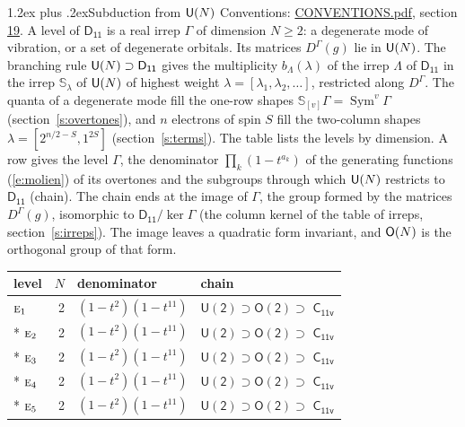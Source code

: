 \documentclass[10pt,a4paper]{article}
\makeatletter
\renewcommand\section{\@startsection{section}{1}{\z@}{-3ex plus -1ex minus -.2ex}%
  {1.2ex plus .2ex}{\normalfont\large\sffamily\bfseries\color{parttitle}}}
\numberwithin{equation}{section}
\newcommand{\grp}[1]{\mathsf{#1}}
\newcommand{\irr}[1]{\text{\normalfont\scshape #1}}
\newcommand{\repD}[1]{D^{#1}}
\newcommand{\schur}[1]{\mathbb{S}_{#1}}
\newcommand{\shape}[1]{[#1]}
\makeatother
\begin{document}
\section{Subduction from \texorpdfstring{$\grp{U(\mathnormal{N})}$}{U(N)}}\label{s:unitary}
Conventions: \href{../../CONVENTIONS.pdf}{CONVENTIONS.pdf}, section \href{../../CONVENTIONS.pdf\#conv.19}{19}.
\leavevmode\label{n:local.level.dimension}A level of $\grp{D_{11}}$ is a real irrep $\Gamma$ of dimension $N \ge 2$: a degenerate mode of vibration, or a set of degenerate orbitals. \label{n:group.unitary}Its matrices $\repD{\Gamma}(g)$ lie in $\grp{U(\mathnormal{N})}$. \label{n:irrep.schur}\label{n:shape.partition}\label{n:local.partition}\label{n:function.multiplicity.unitary}The branching rule $\grp{U(\mathnormal{N})} \supset \grp{D_{11}}$ gives the multiplicity $b_\Lambda(\lambda)$ of the irrep $\Lambda$ of $\grp{D_{11}}$ in the irrep $\schur{\lambda}$ of $\grp{U(\mathnormal{N})}$ of highest weight $\lambda = \shape{\lambda_1, \lambda_2, \dots}$, restricted along $\repD{\Gamma}$. \label{n:local.partition.power}\label{n:local.electrons}\label{n:local.spin}The quanta of a degenerate mode fill the one-row shapes $\schur{\shape{v}}\Gamma = \operatorname{Sym}^{v}\Gamma$ (section~\ref{s:overtones}), and $n$ electrons of spin $S$ fill the two-column shapes $\lambda = \shape{2^{n/2-S}, 1^{2S}}$ (section~\ref{s:terms}).
The table lists the levels by dimension. \label{n:head.level}\label{n:head.denominator}\label{n:index.overtone.denominator}\label{n:head.chain}A row gives the level $\Gamma$, the denominator $\prod_k (1 - t^{a_k})$ of the generating functions (\ref{e:molien}) of its overtones and the subgroups through which $\grp{U(\mathnormal{N})}$ restricts to $\grp{D_{11}}$ (chain). The chain ends at the image of $\Gamma$, the group formed by the matrices $\repD{\Gamma}(g)$, isomorphic to $\grp{D_{11}}/\ker\Gamma$ (the column kernel of the table of irreps, section~\ref{s:irreps}). The image leaves a quadratic form invariant, and $\grp{O(\mathnormal{N})}$ is the orthogonal group of that form.
{\small\begin{longtable}{@{}lrll@{}}\toprule
level & $N$ & denominator & chain\\\midrule\endhead
\bottomrule\endfoot\endlastfoot
$\irr{e}_{1}$ & 2 & $(1-t^{2})(1-t^{11})$ & $\grp{U(2)} \supset \grp{O(2)} \supset$ \href{C11v.pdf}{$\grp{C_{11v}}$}\\*
$\irr{e}_{2}$ & 2 & $(1-t^{2})(1-t^{11})$ & $\grp{U(2)} \supset \grp{O(2)} \supset$ \href{C11v.pdf}{$\grp{C_{11v}}$}\\*
$\irr{e}_{3}$ & 2 & $(1-t^{2})(1-t^{11})$ & $\grp{U(2)} \supset \grp{O(2)} \supset$ \href{C11v.pdf}{$\grp{C_{11v}}$}\\*
$\irr{e}_{4}$ & 2 & $(1-t^{2})(1-t^{11})$ & $\grp{U(2)} \supset \grp{O(2)} \supset$ \href{C11v.pdf}{$\grp{C_{11v}}$}\\*
$\irr{e}_{5}$ & 2 & $(1-t^{2})(1-t^{11})$ & $\grp{U(2)} \supset \grp{O(2)} \supset$ \href{C11v.pdf}{$\grp{C_{11v}}$}\\
\bottomrule\end{longtable}}
\end{document}

